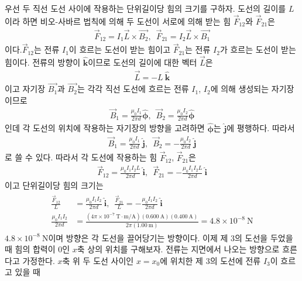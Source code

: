 \documentclass[tightenlines,floatfix,nofootinbib,superscriptaddress,fleqn]{revtex4}
\begin{document}
우선 두 직선 도선 사이에 작용하는 단위길이당 힘의 크기를 구하자. 도선의 길이를 $L$이라 하면
비오-사바르 법칙에 의해 두 도선이 서로에 의해 받는 힘 $\vec{F}_{12}$와 $\vec{F}_{21}$은
\begin{align}
  \vec{F}_{12} = I_1\vec{L}\times \vec{B_2},\,\,\,
  \vec{F}_{21} = I_2\vec{L}\times \vec{B_1}
\end{align}
이다.$\vec{F}_{12}$는 전류 $I_1$이 흐르는 도선이 받는 힘이고 $\vec{F}_{21}$는
전류 $I_2$가 흐르는 도선이 받는 힘이다.  전류의 방향이
$\hat{\bm k}$이므로 도선의 길이에 대한 벡터 $\vec{L}$은
\begin{align}
  \vec{L} = -L~\hat{\bm k}
\end{align}
이고 자기장 $\vec{B_1}$과 $\vec{B_2}$는 각각 직선 도선에 흐르는 전류 $I_1$, $I_2$에 
의해 생성되는 자기장이므로
\begin{align}
  \vec{B}_1 =  \frac{\mu_0 I_1}{2\pi d}\hat{\bm \phi},\,\,\,
  \vec{B}_2 =  \frac{\mu_0 I_2}{2\pi d}\hat{\bm \phi}
\end{align}
인데 각 도선의 위치에 작용하는 자기장의 방향을 고려하면 $\hat{\bm \phi}$는 
$\hat{\bm j}$에 평행하다. 따라서
\begin{align}
  \vec{B}_1 =  \frac{\mu_0 I_1}{2\pi d}~\hat{\bm j},\,\,\,
  \vec{B}_2 =  -\frac{\mu_0 I_2}{2\pi d}~\hat{\bm j}
\end{align} 
로 쓸 수 있다. 따라서 각 도선에 작용하는 힘 $\vec{F}_{12}$, $\vec{F}_{21}$은
\begin{align}
  \vec{F}_{12} = \frac{\mu_0I_1 I_2 L}{2\pi d}~\hat{\bm i}
  ,\,\,\,
  \vec{F}_{21} = -\frac{\mu_0I_1 I_2 L}{2\pi d}~\hat{\bm i}
\end{align}
이고 단위길이당 힘의 크기는
\begin{align}
  \begin{split}
    \frac{\vec{F}_{12}}{L} &= \frac{\mu_0I_1 I_2 }{2\pi d}~\hat{\bm i}
    ,\,\,\,
    \frac{\vec{F}_{21}}{L} = -\frac{\mu_0I_1 I_2 }{2\pi d}~\hat{\bm i} \\
    \frac{\mu_0I_1 I_2 }{2\pi d} &= \frac{(4\pi\times 10^{-7}~\mathrm{T\cdot m/A})
    (0.600~\mathrm{A}) (0.400~\mathrm{A}) }{2\pi (1.00~\mathrm{m})}
    =4.8\times 10^{-8}~\mathrm{N}
  \end{split}
\end{align}
$4.8\times 10^{-8}~\mathrm{N}$이며 방향은 각 도선을 끌어당기는 방향이다. 이제 제 3의 도선을 
두었을 때 힘의 합력이 $0$인 $x$축 상의 위치를 구해보자. 전류는 지면에서 나오는 방향으로 흐른다고
가정한다. $x$축 위 두 도선 사이인 $x=x_0$에 위치한 제 3의 도선에 전류 $I_3$이 흐르고 있을 때 
\end{document}
